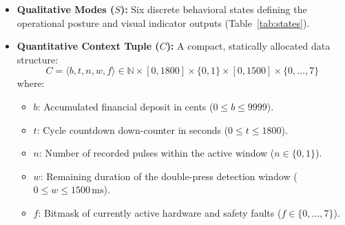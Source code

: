 \begin{itemize}
  \item \textbf{Qualitative Modes ($S$):} Six discrete behavioral states defining the operational posture
        and visual indicator outputs (Table~\ref{tab:states}).
  \item \textbf{Quantitative Context Tuple ($C$):} A compact, statically allocated data structure:
        \begin{equation}
          C = \big\langle b, t, n, w, f \big\rangle \in \mathbb{N} \times [0, 1800] \times \{0, 1\} \times [0, 1500] \times \{0, \dots, 7\}
        \end{equation}
        where:
        \begin{itemize}
          \item $b$: Accumulated financial deposit in cents ($0 \le b \le 9999$).
          \item $t$: Cycle countdown down-counter in seconds ($0 \le t \le 1800$).
          \item $n$: Number of recorded  pulses within the active window ($n \in \{0, 1\}$).
          \item $w$: Remaining duration of the double-press detection window ($0 \le w \le 1500\,\text{ms}$).
          \item $f$: Bitmask of currently active hardware and safety faults ($f \in \{0, \dots, 7\}$).
        \end{itemize}
\end{itemize}

